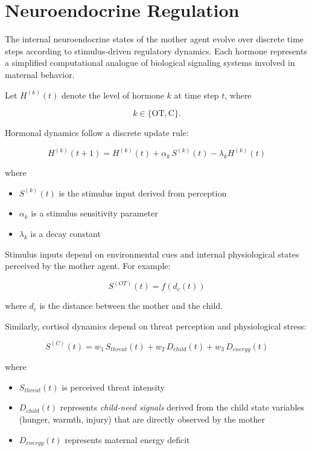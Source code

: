 \section{Neuroendocrine Regulation}

The internal neuroendocrine states of the mother agent evolve over discrete
time steps according to stimulus-driven regulatory dynamics. Each hormone
represents a simplified computational analogue of biological signaling
systems involved in maternal behavior.

Let \(H^{(k)}(t)\) denote the level of hormone \(k\) at time step \(t\),
where

\[
k \in \{\mathrm{OT}, \mathrm{C}\}.
\]

Hormonal dynamics follow a discrete update rule:

\[
H^{(k)}(t+1)
=
H^{(k)}(t)
+
\alpha_k \, S^{(k)}(t)
-
\lambda_k H^{(k)}(t)
\]

where

\begin{itemize}
\item \(S^{(k)}(t)\) is the stimulus input derived from perception
\item \(\alpha_k\) is a stimulus sensitivity parameter
\item \(\lambda_k\) is a decay constant
\end{itemize}

Stimulus inputs depend on environmental cues and internal physiological
states perceived by the mother agent. For example:

\[
S^{(OT)}(t) = f(d_c(t))
\]

where \(d_c\) is the distance between the mother and the child.

Similarly, cortisol dynamics depend on threat perception and physiological
stress:

\[
S^{(C)}(t) =
w_1 \, S_{threat}(t)
+
w_2 \, D_{child}(t)
+
w_3 \, D_{energy}(t)
\]

where

\begin{itemize}
\item \(S_{threat}(t)\) is perceived threat intensity
\item \(D_{child}(t)\) represents \emph{child-need signals} derived from the child state variables (hunger, warmth, injury) that are directly observed by the mother
\item \(D_{energy}(t)\) represents maternal energy deficit
\end{itemize}

